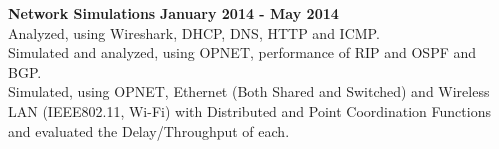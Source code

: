 \documentclass[margin,line]{resume}
\begin{document}
\begin{resume}
    \textbf{\listing Network Simulations} \hfill \textbf{January 2014 - May 2014}\vspace{2mm}\\
    Analyzed, using Wireshark, DHCP, DNS, HTTP and ICMP.\\
    Simulated and analyzed, using OPNET, performance of RIP and OSPF and BGP.\\
    Simulated, using OPNET, Ethernet (Both Shared and Switched) and Wireless LAN (IEEE802.11, Wi-Fi) with Distributed and Point Coordination Functions and evaluated the Delay/Throughput of each.
    

	
\end{resume}
\end{document}
